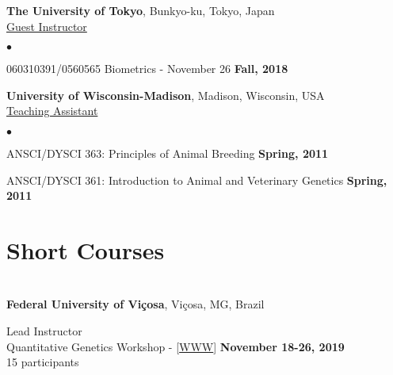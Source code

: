 \documentclass[margin,line,10pt]{res}
\newenvironment{list2}{
  \begin{list}{$\bullet$}{%
      \setlength{\itemsep}{0in}
      \setlength{\parsep}{0in} \setlength{\parskip}{0in}
      \setlength{\topsep}{0in} \setlength{\partopsep}{0in} 
      \setlength{\leftmargin}{0.2in}}}{\end{list}}
\begin{document}
\begin{resume}
  \vspace{1cm}

{\bf The University of Tokyo}, Bunkyo-ku, Tokyo, Japan \vspace{0.2cm} \\
\underline{Guest Instructor}
\vspace{0.4cm}
 \begin{list2}
 \item 060310391/0560565 Biometrics - November 26 \hfill {\bf Fall, 2018}
 \end{list2}


 \vspace{1cm}
 
{\bf University of Wisconsin-Madison}, Madison, Wisconsin, USA  \vspace{0.2cm}  \\
\underline{Teaching Assistant} 
 \vspace{0.4cm}
\begin{list2}
\item ANSCI/DYSCI 363: Principles of Animal Breeding    \hfill {\bf Spring, 2011}

\vspace{0.5cm}

\item ANSCI/DYSCI 361: Introduction to Animal and Veterinary Genetics    \hfill {\bf Spring, 2011} 

  \end{list2}



\vspace{0.5cm}
\section{\sc Short Courses}
\vspace{1cm}






\section{}


{\bf Federal University of Vi\c cosa}, Vi\c cosa, MG, Brazil
\vspace{.01pt}

Lead Instructor  \\
Quantitative Genetics Workshop - [\textcolor{blue}{\href{http://morotalab.org/UFV2019/UFV2019.html}{WWW}}]
\hfill {\bf November 18-26, 2019} \\
15 participants



\end{resume}
\end{document}
